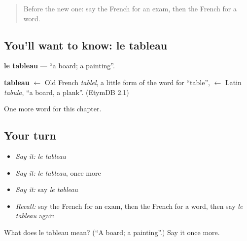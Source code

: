 \label{lesson:FR-C126-tableau}



\begin{quote}
Before the new one: say the French for an exam, then the French for a word.
\end{quote}

\subsection*{You'll want to know: le tableau}
\textbf{le tableau} — \textquotedblleft{}a board; a painting\textquotedblright{}.

\begin{cousinweb}
\textbf{tableau} $\leftarrow$ Old French \emph{tablel}, a little form of the word for \textquotedblleft{}table\textquotedblright{}, $\leftarrow$ Latin \emph{tabula}, \textquotedblleft{}a board, a plank\textquotedblright{}. (EtymDB 2.1)
\end{cousinweb}

\begin{grammarlens}[title={What you've built}]
One more word for this chapter.
\end{grammarlens}

\subsection*{Your turn}
\begin{itemize}
\raggedright
  \item \emph{Say it:} \emph{le tableau}
  \item \emph{Say it:} \emph{le tableau}, once more
  \item \emph{Say it:} say \emph{le tableau}
  \item \emph{Recall:} say the French for an exam, then the French for a word, then say \emph{le tableau} again
\end{itemize}

\begin{tcolorbox}[breakable,colback=teal!4,colframe=teal!35!black,title={Before you move on}]
What does le tableau mean? (\textquotedblleft{}A board; a painting\textquotedblright{}.) Say it once more.
\end{tcolorbox}
